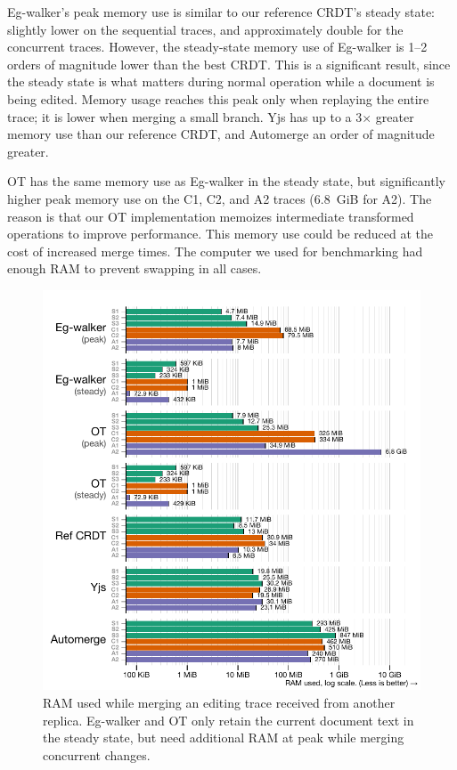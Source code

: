 \documentclass[sigplan,10pt]{acmart}
\newcommand{\algname}{Eg-walker\xspace}
\begin{document}
\algname's peak memory use is similar to our reference CRDT's steady state: slightly lower on the sequential traces, and approximately double for the concurrent traces.
However, the steady-state memory use of \algname is 1--2 orders of magnitude lower than the best CRDT.
This is a significant result, since the steady state is what matters during normal operation while a document is being edited.
Memory usage reaches this peak only when replaying the entire trace; it is lower when merging a small branch.
Yjs has up to a 3$\times$ greater memory use than our reference CRDT, and Automerge an order of magnitude greater.


OT has the same memory use as \algname in the steady state, but significantly higher peak memory use on the C1, C2, and A2 traces (6.8~GiB for A2).
The reason is that our OT implementation memoizes intermediate transformed operations to improve performance.
This memory use could be reduced at the cost of increased merge times.
The computer we used for benchmarking had enough RAM to prevent swapping in all cases.

\begin{figure}
  \includegraphics[width=\linewidth]{diagrams/memusage.pdf}
  \caption{RAM used while merging an editing trace received from another replica. \algname and OT only retain the current document text in the steady state, but need additional RAM at peak while merging concurrent changes.}
  \label{chart-memusage}
\end{figure}
\end{document}
